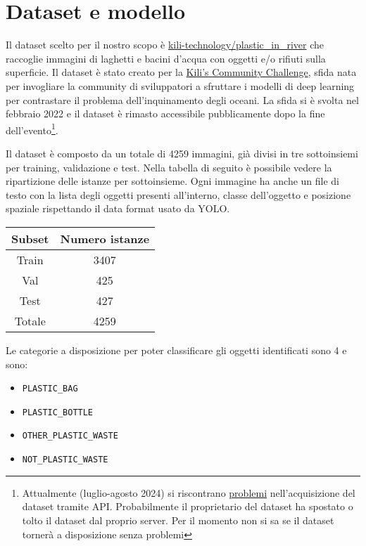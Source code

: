 \section*{Dataset e modello}

Il dataset scelto per il nostro scopo è \href{https://huggingface.co/datasets/kili-technology/plastic_in_river}{kili-technology/plastic\_in\_river}
che raccoglie immagini di laghetti e bacini d'acqua con oggetti e/o rifiuti sulla superficie. 
Il dataset è stato creato per la \href{https://kili-technology.com/data-labeling/machine-learning/kili-s-community-challenge-plastic-in-river-dataset}{Kili's Community Challenge},
sfida nata per invogliare la community di sviluppatori a sfruttare i modelli di deep learning per contrastare il problema dell'inquinamento degli oceani. 
La sfida si è svolta nel febbraio 2022 e il dataset è rimasto accessibile pubblicamente dopo la fine 
dell'evento\footnote[1]{Attualmente (luglio-agosto 2024) si riscontrano \href{https://huggingface.co/datasets/kili-technology/plastic_in_river/discussions/2}{problemi} nell'acquisizione del dataset tramite API. Probabilmente il proprietario del dataset 
ha spostato o tolto il dataset dal proprio server. Per il momento non si sa se il dataset tornerà a disposizione senza problemi}. 

Il dataset è composto da un totale di 4259 immagini, già divisi in tre sottoinsiemi per training, validazione e test. Nella tabella di seguito 
è possibile vedere la ripartizione delle istanze per sottoinsieme. Ogni immagine ha anche un file di testo con 
la lista degli oggetti presenti all'interno, classe dell'oggetto e posizione spaziale rispettando il data format usato da YOLO.

\begin{center}
    \begin{tabular}{ |c||c| } 
     \hline
     \textbf{Subset} & \textbf{Numero istanze} \\ 
     \hline
     Train & 3407 \\ 
     Val & 425 \\ 
     Test & 427 \\ 
     \hline
     Totale & 4259 \\
     \hline
    \end{tabular}
    \end{center}

Le categorie a disposizione per poter classificare gli oggetti identificati sono 4 e sono:

\begin{itemize}
    \item \verb+PLASTIC_BAG+
    \item \verb+PLASTIC_BOTTLE+
    \item \verb+OTHER_PLASTIC_WASTE+
    \item \verb+NOT_PLASTIC_WASTE+
\end{itemize}

